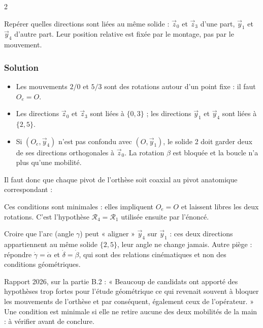 \documentclass[11pt,a4paper]{article}
\providecommand{\tightlist}{\setlength{\itemsep}{0pt}\setlength{\parskip}{0pt}}
\newcommand{\equationajustee}[1]{%
  \sbox{\boiteequation}{$\displaystyle #1$}%
  \ifdim\wd\boiteequation>\linewidth
    \[\resizebox{\linewidth}{!}{\usebox{\boiteequation}}\]%
  \else
    \[#1\]%
  \fi}
\begin{document}
\begin{indication}{2}

Repérer quelles directions sont liées au même solide : \(\vec z_0\) et \(\vec z_3\) d'une part, \(\vec y_1\) et \(\vec y_4\) d'autre part. Leur position relative est fixée par le montage, pas par le mouvement.

\end{indication}

\hypertarget{solution-7}{%
\subsubsection{Solution}\label{solution-7}}

\begin{itemize}
\tightlist
\item
  Les mouvements \(2/0\) et \(5/3\) sont des rotations autour d'un point fixe : il faut \(O_e=O\).
\item
  Les directions \(\vec z_0\) et \(\vec z_3\) sont liées à \(\{0,3\}\) ; les directions \(\vec y_1\) et \(\vec y_4\) sont liées à \(\{2,5\}\).
\item
  Si \((O_e,\vec y_4)\) n'est pas confondu avec \((O,\vec y_1)\), le solide 2 doit garder deux de ses directions orthogonales à \(\vec z_0\). La rotation \(\beta\) est bloquée et la boucle n'a plus qu'une mobilité.
\end{itemize}

Il faut donc que chaque pivot de l'orthèse soit coaxial au pivot anatomique correspondant :

\equationajustee{\boxed{(O_e,\vec z_3)\equiv(O,\vec z_0)\quad\text{et}\quad(O_e,\vec y_4)\equiv(O,\vec y_1)}}

Ces conditions sont minimales : elles impliquent \(O_e=O\) et laissent libres les deux rotations. C'est l'hypothèse \(\mathcal R_4=\mathcal R_1\) utilisée ensuite par l'énoncé.

\begin{piege}

Croire que l'arc (angle \(\gamma\)) peut « aligner » \(\vec y_4\) sur \(\vec y_1\) : ces deux directions appartiennent au même solide \(\{2,5\}\), leur angle ne change jamais. Autre piège : répondre \(\dot\gamma=\dot\alpha\) et \(\dot\delta=\dot\beta\), qui sont des relations cinématiques et non des conditions géométriques.

\end{piege}

\begin{jury}

Rapport 2026, sur la partie B.2 : « Beaucoup de candidats ont apporté des hypothèses trop fortes pour l'étude géométrique ce qui revenait souvent à bloquer les mouvements de l'orthèse et par conséquent, également ceux de l'opérateur. » Une condition est minimale si elle ne retire aucune des deux mobilités de la main : à vérifier avant de conclure.

\end{jury}
\end{document}
